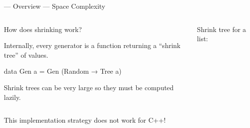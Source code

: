 \begin{frame}[fragile]{\halcheck{} --- Overview --- Space Complexity}
  \begin{columns}[t,onlytextwidth]
    \begin{block}{How does shrinking work?}
      \bigskip

      Internally, every generator is a function returning a ``shrink tree'' of values.

      \bigskip

      \begin{haskellcode}
        data Gen a = Gen (Random → Tree a)
      \end{haskellcode}

      Shrink trees can be \alert{very large} so they must be computed lazily.
    \end{block}

    \begin{block}{Shrink tree for a list:}
    \end{block}
  \end{columns}

  \pause{}

  This implementation strategy \alert{does not work for C++!}
\end{frame}

